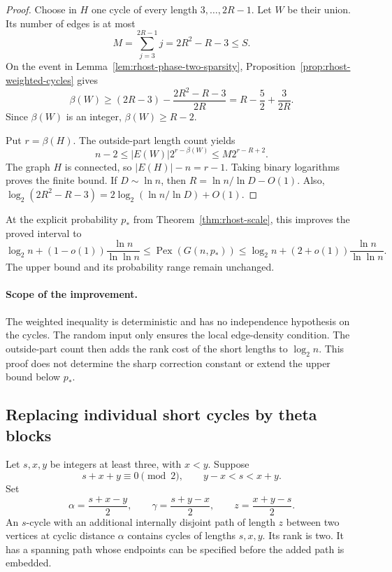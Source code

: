 \begin{proof}
Choose in $H$ one cycle of every length $3,\ldots,2R-1$.
Let $W$ be their union.
Its number of edges is at most
\[
 M=\sum_{j=3}^{2R-1}j=2R^2-R-3\le S.
\]
On the event in Lemma~\ref{lem:rhost-phase-two-sparsity},
Proposition~\ref{prop:rhost-weighted-cycles} gives
\[
 \beta(W)\ge(2R-3)-\frac{2R^2-R-3}{2R}
 =R-\frac52+\frac{3}{2R}.
\]
Since $\beta(W)$ is an integer, $\beta(W)\ge R-2$.

Put $r=\beta(H)$.
The outside-part length count yields
\[
 n-2\le |E(W)|2^{r-\beta(W)}\le M2^{r-R+2}.
\]
The graph $H$ is connected, so $|E(H)|-n=r-1$.
Taking binary logarithms proves the finite bound.
If $D\sim\ln n$, then $R=\ln n/\ln D-O(1)$.
Also, $\log_2(2R^2-R-3)=2\log_2(\ln n/\ln D)+O(1)$.
\end{proof}

At the explicit probability $p_*$ from Theorem~\ref{thm:rhost-scale},
this improves the proved interval to
\[
 \log_2n+(1-o(1))\frac{\ln n}{\ln\ln n}
 \le\operatorname{Pex}(G(n,p_*))
 \le\log_2n+(2+o(1))\frac{\ln n}{\ln\ln n}.
\]
The upper bound and its probability range remain unchanged.

\paragraph{Scope of the improvement.}
The weighted inequality is deterministic and has no independence hypothesis on the cycles.
The random input only ensures the local edge-density condition.
The outside-part count then adds the rank cost of the short lengths to $\log_2n$.
This proof does not determine the sharp correction constant or extend the upper bound below $p_*$.

\subsection{Replacing individual short cycles by theta blocks}
\label{subsec:rhost-theta-upper}

\begin{lemma}
\label{lem:rhost-theta-block}
Let $s,x,y$ be integers at least three, with $x<y$.
Suppose
\[
 s+x+y\equiv0\pmod2,\qquad y-x<s<x+y.
\]
Set
\[
 \alpha=\frac{s+x-y}{2},\qquad
 \gamma=\frac{s+y-x}{2},\qquad
 z=\frac{x+y-s}{2}.
\]
An $s$-cycle with an additional internally disjoint path of length $z$
between two vertices at cyclic distance $\alpha$ contains cycles of lengths $s,x,y$.
Its rank is two.
It has a spanning path whose endpoints can be specified before the added path is embedded.
\end{lemma}

